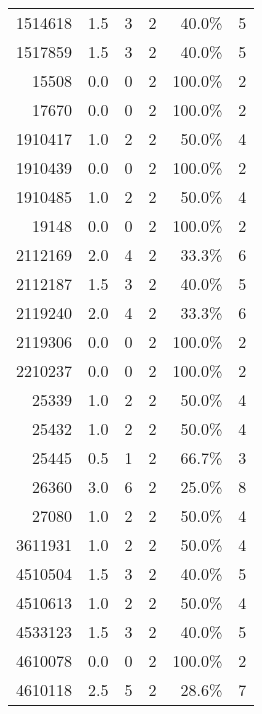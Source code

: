 \begin{longtable}{lrrrrr}
	    \multicolumn{1}{r}{1514618} & 1.5   & 3     & 2     & 40.0\% & 5 \\
	    \multicolumn{1}{r}{1517859} & 1.5   & 3     & 2     & 40.0\% & 5 \\
	    \multicolumn{1}{r}{15508} & 0.0   & 0     & 2     & 100.0\% & 2 \\
	    \multicolumn{1}{r}{17670} & 0.0   & 0     & 2     & 100.0\% & 2 \\
	    \multicolumn{1}{r}{1910417} & 1.0   & 2     & 2     & 50.0\% & 4 \\
	    \multicolumn{1}{r}{1910439} & 0.0   & 0     & 2     & 100.0\% & 2 \\
	    \multicolumn{1}{r}{1910485} & 1.0   & 2     & 2     & 50.0\% & 4 \\
	    \multicolumn{1}{r}{19148} & 0.0   & 0     & 2     & 100.0\% & 2 \\
	    \multicolumn{1}{r}{2112169} & 2.0   & 4     & 2     & 33.3\% & 6 \\
	    \multicolumn{1}{r}{2112187} & 1.5   & 3     & 2     & 40.0\% & 5 \\
	    \multicolumn{1}{r}{2119240} & 2.0   & 4     & 2     & 33.3\% & 6 \\
	    \multicolumn{1}{r}{2119306} & 0.0   & 0     & 2     & 100.0\% & 2 \\
	    \multicolumn{1}{r}{2210237} & 0.0   & 0     & 2     & 100.0\% & 2 \\
	    \multicolumn{1}{r}{25339} & 1.0   & 2     & 2     & 50.0\% & 4 \\
	    \multicolumn{1}{r}{25432} & 1.0   & 2     & 2     & 50.0\% & 4 \\
	    \multicolumn{1}{r}{25445} & 0.5   & 1     & 2     & 66.7\% & 3 \\
	    \multicolumn{1}{r}{26360} & 3.0   & 6     & 2     & 25.0\% & 8 \\
	    \multicolumn{1}{r}{27080} & 1.0   & 2     & 2     & 50.0\% & 4 \\
	    \multicolumn{1}{r}{3611931} & 1.0   & 2     & 2     & 50.0\% & 4 \\
	    \multicolumn{1}{r}{4510504} & 1.5   & 3     & 2     & 40.0\% & 5 \\
	    \multicolumn{1}{r}{4510613} & 1.0   & 2     & 2     & 50.0\% & 4 \\
	    \multicolumn{1}{r}{4533123} & 1.5   & 3     & 2     & 40.0\% & 5 \\
	    \multicolumn{1}{r}{4610078} & 0.0   & 0     & 2     & 100.0\% & 2 \\
	    \multicolumn{1}{r}{4610118} & 2.5   & 5     & 2     & 28.6\% & 7 \\

\end{longtable}
